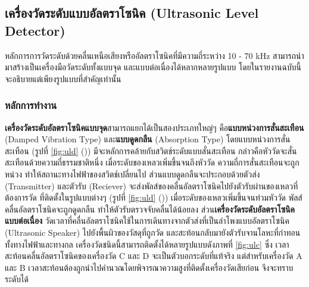 \documentclass[final,11pt,a4paper]{article}
\begin{document}
\subsection{เครื่องวัดระดับแบบอัลตราโซนิค (Ultrasonic Level Detector)}
หลักการการวัดระดับด้วยคลื่นเหนือเสียงหรืออัลตราโซนิคที่มีความถี่ระหว่าง 10 - 70 kHz สามารถนำมาสร้างเป็นเครื่องมือวัดระดับทั้งแบบจุด 
และแบบต่อเนื่องได้หลากหลายรูปแบบ โดยในรายงานฉบับนี้จะอธิบายแต่เพียงรูปแบบที่สำคัญเท่านั้น
\subsubsection{หลักการทำงาน}
\textbf{เครื่องวัดระดับอัลตราโซนิคแบบจุด}สามารถแยกได้เป็นสองประเภทใหญ่ๆ คือ\textbf{แบบหน่วงการสั่นสะเทือน} (Damped Vibration Type)
และ\textbf{แบบดูดกลืน} (Absorption Type) โดยแบบหน่วงการสั่นสะเทือน (รูปที่ \ref{fig:uld} ()) มีจะหลักการคล้ายกับสวิตช์ระดับแบบสั่นสะเทือน 
กล่าวคือหัววัดจะสั่นสะเทือนด้วยความถี่ธรรมชาติหนึ่ง เมื่อระดับของเหลวเพิ่มขึ้นจนถึงหัววัด ความถี่การสั่นสะเทือนจะถูกหน่วง ทำให้สถานะทางไฟฟ้าของสวิตช์เปลี่ยนไป 
ส่วนแบบดูดกลืนจะประกอบด้วยตัวส่ง (Transmitter) และตัวรับ (Reciever) จะส่งพัลส์ของคลื่นอัลตราโซนิคไปยังตัวรับผ่านของเหลวที่ต้องการวัด 
ที่ติดตั้งในรูปแบบต่างๆ (รูปที่ \ref{fig:uld} ()) เมื่อระดับของเหลวเพิ่มขึ้นจนท่วมหัววัด พัลส์คลื่นอัลตราโซนิคจะถูกดูดกลืน ทำให้ตัวรับตรวจจับคลื่นได้น้อยลง 
ส่วน\textbf{เครื่องวัดระดับอัลตราโซนิคแบบต่อเนื่อง} วัดเวลาที่คลื่นอัลตราโซนิคใช้ในการเดินทางจากตัวส่งที่เป็นลำโพงแบบอัลตราโซนิค (Ultrasonic Speaker)
ไปยังพื้นผิวของวัสดุที่ถูกวัด และสะท้อนกลับมายังตัวรับจานโลหะที่กำทอนทั้งทางไฟฟ้าและทางกล เครื่องวัดชนิดนี้สามารถติดตั้งได้หลายรูปแบบดังภาพที่ \ref{fig:ulc} ซึ่ง
เวลาสะท้อนคลื่นอัลตราโซนิคของเครื่องวัด C และ D จะเป็นตัวบอกระดับที่แท้จริง แต่สำหรับเครื่องวัด A และ B 
เวลาสะท้อนต้องถูกนำไปคำนวณโดยพิจารณาความสูงที่ติดตั้งเครื่องวัดเสียก่อน จึงจะทราบระดับได้
\end{document}
